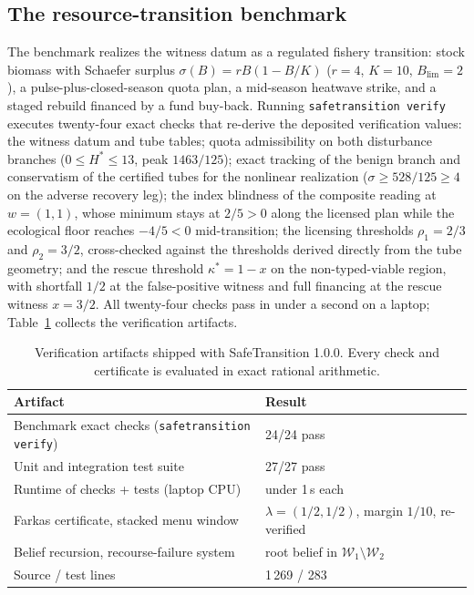 \documentclass[3p,11pt]{elsarticle}
\begin{document}
\subsection{The resource-transition benchmark}\label{sec:benchmark}

The benchmark realizes the witness datum as a regulated fishery transition:
stock biomass with Schaefer surplus $\sigma(B) = rB(1 - B/K)$ ($r = 4$,
$K = 10$, $B_{\mathrm{lim}} = 2$), a pulse-plus-closed-season quota plan,
a mid-season heatwave strike, and a staged rebuild financed by a fund
buy-back. Running \texttt{safetransition verify} executes twenty-four exact
checks that re-derive the deposited verification values: the witness datum
and tube tables; quota admissibility on both disturbance branches
($0 \leq H^* \leq 13$, peak $1463/125$); exact tracking of the benign
branch and conservatism of the certified tubes for the nonlinear
realization ($\sigma \geq 528/125 \geq 4$ on the adverse recovery leg); the
index blindness of the composite reading at $w = (1, 1)$, whose minimum
stays at $2/5 > 0$ along the licensed plan while the ecological floor
reaches $-4/5 < 0$ mid-transition; the licensing thresholds
$\rho_1 = 2/3$ and $\rho_2 = 3/2$, cross-checked against the thresholds
derived directly from the tube geometry; and the rescue threshold
$\kappa^* = 1 - x$ on the non-typed-viable region, with shortfall $1/2$ at
the false-positive witness and full financing at the rescue witness
$x = 3/2$. All twenty-four checks pass in under a second on a laptop;
Table~\ref{tab:qa} collects the verification artifacts.

\begin{table}[t]
\centering
\small
\begin{tabular}{@{}ll@{}}
\toprule
Artifact & Result \\
\midrule
Benchmark exact checks (\texttt{safetransition verify}) & 24/24 pass \\
Unit and integration test suite & 27/27 pass \\
Runtime of checks + tests (laptop CPU) & under 1\,s each \\
Farkas certificate, stacked menu window & $\lambda = (1/2, 1/2)$, margin
$1/10$, re-verified \\
Belief recursion, recourse-failure system & root belief in
$\mathcal{W}_1 \setminus \mathcal{W}_2$ \\
Source / test lines & 1\,269 / 283 \\
\bottomrule
\end{tabular}
\caption{Verification artifacts shipped with SafeTransition 1.0.0. Every
check and certificate is evaluated in exact rational arithmetic.}
\label{tab:qa}
\end{table}
\end{document}
